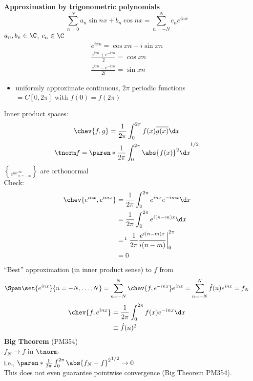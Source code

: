\textbf{Approximation by trigonometric polynomials} \\
\[ \sum_{n=0}^N a_n\sin nx + b_n\cos nx = \sum_{n=-N}^N c_n e^{inx} \]
$a_n,b_n\in\C$, $c_n\in\C$%
\begin{gather*}
e^{ixn} = \cos xn + i\sin xn \\
\frac{e^{ixn}+e^{-ixn}}{2} = \cos xn \\
\frac{e^{ixn}-e^{-ixn}}{2i} = \sin xn
\end{gather*}
\begin{itemize}
\item uniformly approximate continuous, $2\pi$ periodic functions \\
$=C[0,2\pi]$ with $f(0)=f(2\pi)$
\end{itemize}
Inner product spaces:
\begin{gather*}
\chev{f,g} = \frac{1}{2\pi}\int_0^{2\pi}f(x)\overline{g(x)}\d x \\
\tnorm f = \paren*{\frac{1}{2\pi}\int_0^{2\pi}\abs{f(x)}^2\d x}^{1/2}
\end{gather*}
$\brace{e^{inx}}_{n=-\infty}^\infty$ are orthonormal \\
Check:
\begin{align*}
\chev{e^{inx},e^{imx}} &= \frac{1}{2\pi}\int_0^{2\pi}e^{inx}e^{-imx}\d x \\
&= \frac{1}{2\pi} \int_0^{2\pi} e^{i(n-m)x}\d x \\
&=\!\footnotemark \left. \frac{1}{2\pi} \frac{e^{i(n-m)x}}{i(n-m)} \right\rvert_0^{2\pi} \\
&= 0
\end{align*}%
``Best'' approximation (in inner product sense) to $f$ from
\[ \Span\set{e^{inx}}{n=-N,\dotsc,N} = \sum_{n=-N}^N \chev{f,e^{-inx}}e^{inx} = \sum_{n=-N}^N \hat f(n) e^{inx} = f_N \]
\begin{align*}
\chev{f,e^{inx}} &= \frac{1}{2\pi} \int_0^{2\pi} f(x) e^{-inx}\d x \\
&\equiv \hat f(n)\footnotemark
\end{align*}%
%
\textbf{Big Theorem} (PM354) \\
$f_N\to f$ in $\tnorm\cdot$ \\
i.e., $\paren*{\frac{1}{2\pi}\int_0^{2\pi}\abs{f_N-f}^2}^{1/2}\to0$ \\
This does not even guarantee pointwise convergence (Big Theorem PM354).


